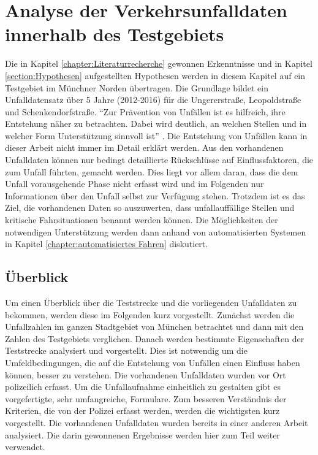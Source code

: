 
\chapter{Analyse der Verkehrsunfalldaten innerhalb des Testgebiets}\label{chapter:Datenauswertung}
Die in Kapitel \ref{chapter:Literaturrecherche} gewonnen Erkenntnisse und in Kapitel \ref{section:Hypothesen} aufgestellten Hypothesen werden in diesem Kapitel auf ein Testgebiet im Münchner Norden übertragen. Die Grundlage bildet ein Unfalldatensatz über 5 Jahre (2012-2016) für die Ungererstraße, Leopoldstraße und Schenkendorfstraße. \enquote{Zur Prävention von Unfällen ist es hilfreich, ihre Entstehung näher zu betrachten. Dabei wird deutlich, an welchen Stellen und in welcher Form Unterstützung sinnvoll ist} \parencite[S. 43]{Fricke.2006}. Die Entstehung von Unfällen kann in dieser Arbeit nicht immer im Detail erklärt werden. Aus den vorhandenen Unfalldaten können nur bedingt detaillierte Rückschlüsse auf Einflussfaktoren, die zum Unfall führten, gemacht werden. Dies liegt vor allem daran, dass die dem Unfall vorausgehende Phase nicht erfasst wird und im Folgenden nur Informationen über den Unfall selbst zur Verfügung stehen. Trotzdem ist es das Ziel, die vorhandenen Daten so auszuwerten, dass unfallauffällige Stellen und kritische Fahrsituationen benannt werden können. Die Möglichkeiten der notwendigen Unterstützung werden dann anhand von automatisierten Systemen in Kapitel \ref{chapter:automatisiertes Fahren} diskutiert.


\section{Überblick}\label{section:Überblick}
Um einen Überblick über die Teststrecke und die vorliegenden Unfalldaten zu bekommen, werden diese im Folgenden kurz vorgestellt. Zunächst werden die Unfallzahlen im ganzen Stadtgebiet von München betrachtet und dann mit den Zahlen des Testgebiets verglichen. Danach werden bestimmte Eigenschaften der Teststrecke analysiert und vorgestellt. Dies ist notwendig um die Umfeldbedingungen, die auf die Entstehung von Unfällen einen Einfluss haben können, besser zu verstehen. Die vorhandenen Unfalldaten wurden vor Ort polizeilich erfasst. Um die Unfallaufnahme einheitlich zu gestalten gibt es vorgefertigte, sehr umfangreiche, Formulare. Zum besseren Verständnis der Kriterien, die von der Polizei erfasst werden, werden die wichtigsten kurz vorgestellt. Die vorhandenen Unfalldaten wurden bereits in einer anderen Arbeit analysiert. Die darin gewonnenen Ergebnisse werden hier zum Teil weiter verwendet.

